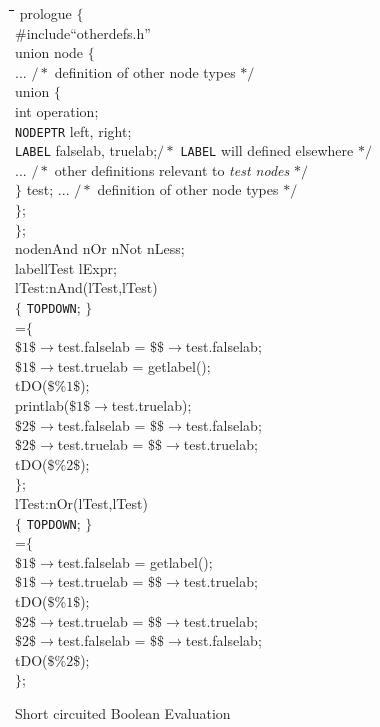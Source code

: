 \begin{figure}
\begin{tabbing}
\hspace{1in}\=\hspace{1in}\=\hspace{1in}\=\hspace{1in}\=
\hspace{1in}\=\hspace{1in}\=\hspace{1in}\=\hspace{1in}\=\kill
prologue \> $\{$\\[4pt]
\#include\>``otherdefs.h''\\
union node $\{$\\
\> $...$ \>\>$/*$ definition of other node types $*/$\\
\> union $\{$\\
\>\> int operation;\\
\>\> {\tt NODEPTR} left, right;\\
\>\> {\tt LABEL} falselab, truelab;\>\>$/*$ {\tt LABEL} will defined
elsewhere $*/$\\
\>\> $...$ \>\> $/*$ other definitions relevant to {\sl test nodes} $*/$\\
\> $\}$ test;
\> $...$ \>\>$/*$ definition of other node types $*/$\\
$\}$;\\[4pt]
$\}$;\\[6pt]
node\>nAnd nOr nNot nLess;\\
label\>lTest lExpr;\\[6pt]
lTest:\>nAnd(lTest,lTest)\\
\>$\{$ {\tt TOPDOWN}; $\}$\\
\>=$\{$\\
\>\>$\$1\$\to$test.falselab = $\$\$\to$test.falselab;\\
\>\>$\$1\$\to$test.truelab = getlabel();\\
\>\>tDO($\$\%1\$$);\\
\>\>printlab($\$1\$\to$test.truelab);\\
\>\>$\$2\$\to$test.falselab = $\$\$\to$test.falselab;\\
\>\>$\$2\$\to$test.truelab = $\$\$\to$test.truelab;\\
\>\>tDO($\$\%2\$$);\\
\>$\}$;\\[4pt]
lTest:\>nOr(lTest,lTest)\\
\>$\{$ {\tt TOPDOWN}; $\}$\\
\>=$\{$\\
\>\>$\$1\$\to$test.falselab = getlabel();\\
\>\>$\$1\$\to$test.truelab = $\$\$\to$test.truelab;\\
\>\>tDO($\$\%1\$$);\\
\>\>$\$2\$\to$test.truelab = $\$\$\to$test.truelab;\\
\>\>$\$2\$\to$test.falselab = $\$\$\to$test.falselab;\\
\>\>tDO($\$\%2\$$);\\
\>$\}$;\\
\end{tabbing}
\caption{Short circuited Boolean Evaluation}
\label{short:circuit}
\end{figure}
